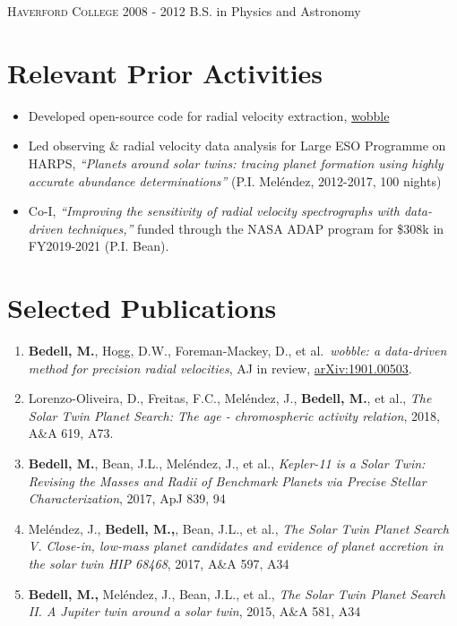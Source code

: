 \documentclass[letter,12pt]{article} %
\begin{document}
\textsc{Haverford College}  \hfill 2008 - 2012
\newline B.S. in Physics and Astronomy 

\section{Relevant Prior Activities}

\begin{itemize}
\item Developed open-source code for radial velocity extraction, \href{https://www.github.com/megbedell/wobble}{wobble}

\item Led observing \& radial velocity data analysis for Large ESO Programme on HARPS, \textit{``Planets around solar twins: tracing planet formation using highly accurate abundance determinations''} (P.I. Mel\'{e}ndez, 2012-2017, 100 nights)

\item Co-I, \textit{``Improving the sensitivity of radial velocity spectrographs with data-driven techniques,''} funded through the NASA ADAP program for \$308k in FY2019-2021 (P.I. Bean).
\end{itemize}



\section{Selected Publications}

\begin{enumerate}
\item \textbf{Bedell, M.}, Hogg, D.W., Foreman-Mackey, D., et al.\ \textit{wobble: a data-driven method for precision radial velocities}, AJ in review, \href{https://arxiv.org/abs/1901.00503}{arXiv:1901.00503}.

\item Lorenzo-Oliveira, D., Freitas, F.C., Mel{\'e}ndez, J., \textbf{Bedell, M.}, et al., \textit{The Solar Twin Planet Search: The age - chromospheric activity relation}, 2018, A\&A 619, A73.

\item \textbf{Bedell, M.}, Bean, J.L., Mel\'{e}ndez, J., et al., \textit{Kepler-11 is a Solar Twin: Revising the Masses and Radii of Benchmark Planets via Precise Stellar Characterization}, 2017, ApJ 839, 94


\item Mel{\'e}ndez, J., \textbf{Bedell, M.,}, Bean, J.L., et al., \textit{The Solar Twin Planet Search V. Close-in, low-mass planet candidates and evidence of planet accretion in the solar twin HIP 68468}, 2017, A\&A 597, A34


\item \textbf{Bedell, M.,} Mel\'{e}ndez, J., Bean, J.L., et al., \textit{The Solar Twin Planet Search II. A Jupiter twin around a solar twin}, 2015, A\&A 581, A34

\end{enumerate}
\end{document}
